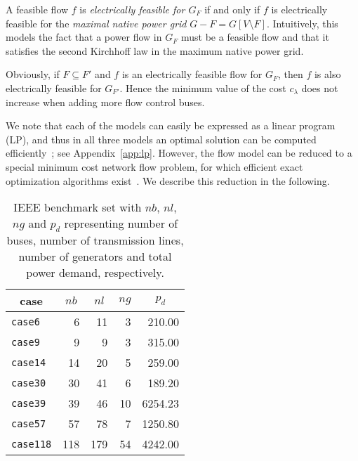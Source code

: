 \documentclass{article}[11pt,a4paper]
\begin{document}
A feasible flow $f$ is \emph{electrically feasible for $G_F$} if and
only if $f$ is electrically feasible for the \emph{maximal native
  power grid} $G-F = G[V \setminus F]$.  Intuitively, this models the
fact that a power flow in $G_F$ must be a feasible flow and that it
satisfies the second Kirchhoff law in the maximum native power grid.

Obviously, if $F \subseteq F'$ and $f$ is an electrically feasible
flow for $G_F$, then $f$ is also electrically feasible for $G_{F'}$.
Hence the minimum value of the cost $c_\lambda$ does not increase when adding
more flow control buses.

We note that each of the models can easily be expressed as a linear
program (LP), and thus in all three models an optimal solution can be
computed efficiently~\cite{Bazaraa:2004:LPN:1062374}; see Appendix~\ref{app:lp}. 
However, the flow model can be reduced to a special minimum cost network flow 
problem, for which efficient exact optimization algorithms exist~\cite{Goldberg19971}.  We 
describe this reduction in the following.
\begin{table}[tb!]
\centering
\begin{tabular}{lrrrr}
  \toprule
  \multicolumn{1}{c}{case} & \multicolumn{1}{c}{$nb$} & \multicolumn{1}{c}{$nl$} & \multicolumn{1}{c}{$ng$} & \multicolumn{1}{c}{$p_d$} \\ 
  \midrule
  \texttt{case6} &   6 &  11 &   3 & 210.00 \\ 
  \texttt{case9} &   9 &   9 &   3 & 315.00 \\ 
  \texttt{case14} &  14 &  20 &   5 & 259.00 \\ 
  \texttt{case30} &  30 &  41 &   6 & 189.20 \\ 
  \texttt{case39} &  39 &  46 &  10 & 6254.23 \\ 
  \texttt{case57} &  57 &  78 &   7 & 1250.80 \\ 
  \texttt{case118} & 118 & 179 &  54 & 4242.00 \\ 
   \bottomrule
\end{tabular}
\caption{IEEE benchmark set with $nb$, $nl$, $ng$ and $p_d$ representing number of buses, number of transmission lines, number of generators and total power demand, respectively.} 
\label{tab:examples}
\end{table}
\end{document}
